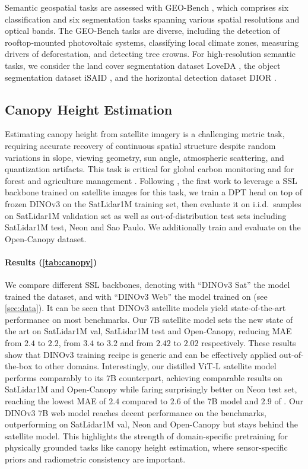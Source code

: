 Semantic geospatial tasks are assessed with GEO-Bench \citep{lacoste2023geo}, which comprises six classification and six segmentation tasks spanning various spatial resolutions and optical bands. The GEO-Bench tasks are diverse, including the detection of rooftop-mounted photovoltaic systems, classifying local climate zones, measuring drivers of deforestation, and detecting tree crowns. For high-resolution semantic tasks, we consider the land cover segmentation dataset LoveDA \citep{wang2022lovedaremotesensinglandcover}, the object segmentation dataset iSAID \citep{zamir2019isaidlargescaledatasetinstance}, and the horizontal detection dataset DIOR \citep{li2020object}. 

\subsection{Canopy Height Estimation}

Estimating canopy height from satellite imagery is a challenging metric task, requiring accurate recovery of continuous spatial structure despite random variations in slope, viewing geometry, sun angle, atmospheric scattering, and quantization artifacts.
This task is critical for global carbon monitoring and for forest and agriculture management \citep{harris2021}.
Following \citet{tolan2024very}, the first work to leverage a SSL backbone trained on satellite images for this task, we train a DPT head on top of frozen DINOv3 on the SatLidar1M training set, then evaluate it on i.i.d.~samples on SatLidar1M validation set as well as out-of-distribution test sets including SatLidar1M test, Neon and Sao Paulo.
We additionally train and evaluate on the Open-Canopy dataset. 

\paragraph[Results]{Results (\cref{tab:canopy})}
We compare different SSL backbones, denoting with ``DINOv3 Sat'' the model trained the \SATdataset dataset, and with ``DINOv3 Web'' the model trained on \LVDdataset (see \cref{sec:data}).
It can be seen that DINOv3 satellite models yield state-of-the-art performance on most benchmarks.
Our 7B satellite model sets the new state of the art on SatLidar1M val, SatLidar1M test and Open-Canopy, reducing MAE from $2.4$ to $2.2$, from $3.4$ to $3.2$ and from $2.42$ to $2.02$ respectively. These results show that DINOv3 training recipe is generic and can be effectively applied out-of-the-box to other domains. 
Interestingly, our distilled ViT-L satellite model performs comparably to its 7B counterpart, achieving comparable results on SatLidar1M and Open-Canopy while faring surprisingly better on Neon test set, reaching the lowest MAE of $2.4$ compared to $2.6$ of the 7B model and $2.9$ of \citet{tolan2024very}.
Our DINOv3 7B web model reaches decent performance on the benchmarks, outperforming \citet{tolan2024very} on SatLidar1M val, Neon and Open-Canopy but stays behind the satellite model.
This highlights the strength of domain-specific pretraining for physically grounded tasks like canopy height estimation, where sensor-specific priors and radiometric consistency are important.


